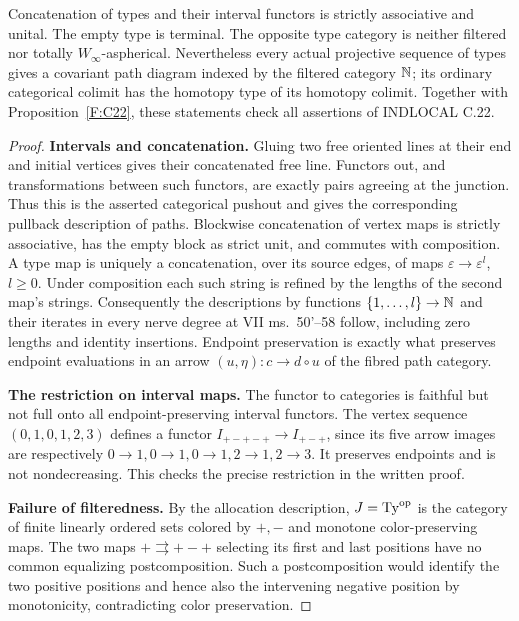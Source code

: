 \begin{proposition}
\label{F:C22-types}
Concatenation of types and their interval functors is strictly
associative and unital. The empty type is terminal. The opposite type
category is neither filtered nor totally $W_\infty$-aspherical.
Nevertheless every actual projective sequence of types gives a
covariant path diagram indexed by the filtered category $\mathbb N$; its
ordinary categorical colimit has the homotopy type of its homotopy
colimit. Together with Proposition~\ref{F:C22}, these statements check
all assertions of \textup{\textsc{INDLOCAL}} C.22.
\end{proposition}
\begin{proof}
\textbf{Intervals and concatenation.} Gluing two free oriented lines at
their end and initial vertices gives their concatenated free line.
Functors out, and transformations between such functors, are exactly
pairs agreeing at the junction. Thus this is the asserted categorical
pushout and gives the corresponding pullback description of paths.
Blockwise concatenation of vertex maps is strictly associative, has the
empty block as strict unit, and commutes with composition. A type map
is uniquely a concatenation, over its source edges, of maps
$\varepsilon\to\varepsilon^l$, $l\geq0$. Under composition each such
string is refined by the lengths of the second map's strings.
Consequently the descriptions by functions $\{1,\ldots,l\}\to\mathbb N$
and their iterates in every nerve degree at VII ms.~50'--58 follow,
including zero lengths and identity insertions. Endpoint preservation
is exactly what preserves endpoint evaluations in an arrow
$(u,\eta):c\to d\circ u$ of the fibred path category.

\textbf{The restriction on interval maps.} The functor to categories
is faithful but not full onto all endpoint-preserving interval
functors. The vertex sequence $(0,1,0,1,2,3)$ defines a functor
$I_{+-+-+}\to I_{+-+}$, since its five arrow images are respectively
$0\to1,0\to1,0\to1,2\to1,2\to3$. It preserves endpoints and is not
nondecreasing. This checks the precise restriction in the written proof.

\textbf{Failure of filteredness.} By the allocation description,
$J=\mathrm{Ty}^{\mathrm {op}}$ is the category of finite linearly ordered
sets colored by $+,-$ and monotone color-preserving maps. The two maps
$+\rightrightarrows +-+$ selecting its first and last positions have
no common equalizing postcomposition. Such a postcomposition would
identify the two positive positions and hence also the intervening
negative position by monotonicity, contradicting color preservation.


\end{proof}
